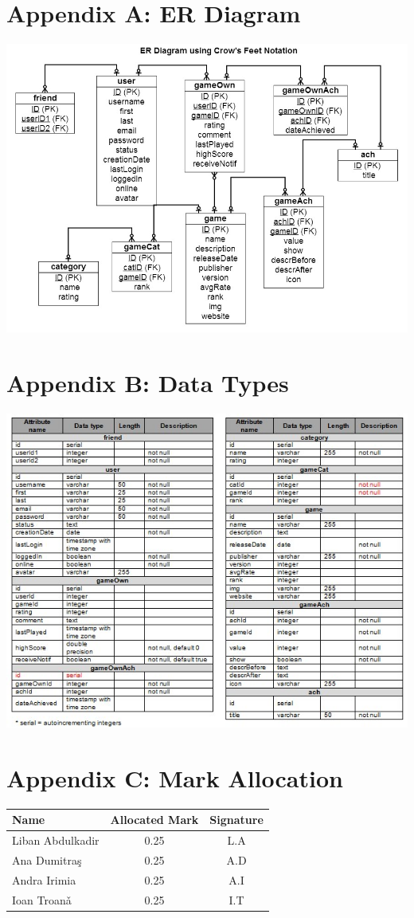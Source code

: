 \documentclass{article}
\begin{document}
\chapter{\textbf{Appendix A: ER Diagram}}
\begin{center}
\includegraphics[width=0.75\columnwidth]{er} %
\end{center}

\chapter{\textbf{Appendix B: Data Types}}
\begin{center}
\includegraphics[width=0.67\columnwidth]{types} %
\end{center}

\chapter{\textbf{Appendix C: Mark Allocation}}
\begin{center}
    \begin{tabular}{| l | c | c |}
    \hline
    \textbf{Name} & \textbf{Allocated Mark} & \textbf{Signature} \\ \hline
    Liban Abdulkadir & 0.25 & L.A \\ \hline
    Ana Dumitra\c{s} & 0.25 & A.D \\ \hline
    Andra Irimia & 0.25 & A.I \\ \hline
    Ioan Troan\v{a} & 0.25 & I.T \\ \hline
    \end{tabular}
\end{center}
\end{document}
